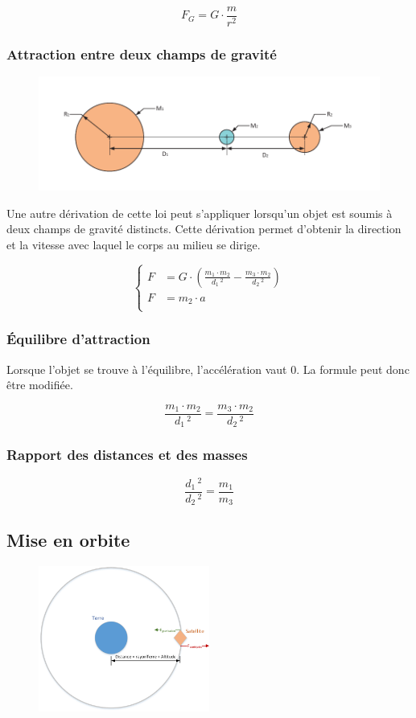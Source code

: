 \documentclass[12pt,a4paper]{article} %
\begin{document}
	\[F_G = G\cdot\frac{m}{r^2}\]

\subsubsection*{Attraction entre deux champs de gravité}
\begin{figure}[h]
	\centering
	\includegraphics{Newton-Gravitation-2Planetes}
\end{figure}
Une autre dérivation de cette loi peut s'appliquer lorsqu'un objet est soumis à deux champs de gravité distincts. Cette dérivation permet d'obtenir la direction et la vitesse avec laquel le corps au milieu se dirige.

	\[\left\{
		\begin{aligned}
			F &= G \cdot \left(\frac{m_1 \cdot m_2}{d_1\,^2} - \frac{m_3 \cdot m_2}{d_2\,^2}\right)\\
			F &= m_2 \cdot a\\
		\end{aligned}
	\right.\]

\subsubsection*{Équilibre d'attraction}
Lorsque l'objet se trouve à l'équilibre, l'accélération vaut 0. La formule peut donc être modifiée.

	\[\frac{m_1 \cdot m_2}{d_1\,^2} = \frac{m_3 \cdot m_2}{d_2\,^2}\]

\subsubsection*{Rapport des distances et des masses}
	\[\frac{d_1\,^2}{d_2\, ^2} = \frac{m_1}{m_3}\]

\newpage

\subsection{Mise en orbite}

\begin{figure}[h]
	\centering
	\includegraphics[width=0.5\textwidth]{Newton-OrbiteGeostationnaire}
\end{figure}
\end{document}
